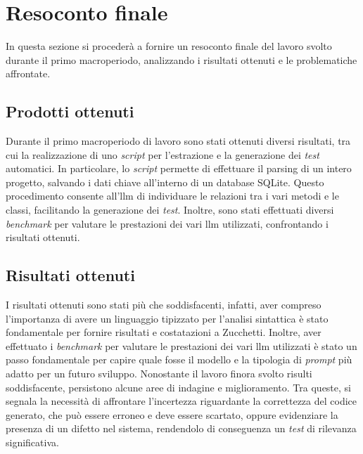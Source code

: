 \section{Resoconto finale}
    In questa sezione si procederà a fornire un resoconto finale del lavoro svolto durante il primo macroperiodo, analizzando i risultati ottenuti e le problematiche affrontate.
    \subsection{Prodotti ottenuti}
    Durante il primo macroperiodo di lavoro sono stati ottenuti diversi risultati, tra cui la realizzazione di uno \textit{script} per l'estrazione e la generazione dei \textit{test} automatici.
    In particolare, lo \textit{script} permette di effettuare il parsing di un intero progetto, salvando i dati chiave all'interno di un database SQLite.
    Questo procedimento consente all'\gls{llm} di individuare le relazioni tra i vari metodi e le classi, facilitando la generazione dei \textit{test}.
    Inoltre, sono stati effettuati diversi \textit{benchmark} per valutare le prestazioni dei vari \gls{llm} utilizzati, confrontando i risultati ottenuti.

    \subsection{Risultati ottenuti}
        I risultati ottenuti sono stati più che soddisfacenti, infatti, aver compreso l'importanza di avere un linguaggio tipizzato per l'analisi 
        sintattica è stato fondamentale per fornire risultati e costatazioni a Zucchetti.
        Inoltre, aver effettuato i \textit{benchmark} per valutare le prestazioni dei vari \gls{llm} utilizzati è stato un passo fondamentale 
        per capire quale fosse il modello e la tipologia di \textit{prompt} più adatto per un futuro sviluppo. 
        Nonostante il lavoro finora svolto risulti soddisfacente, persistono alcune aree di indagine e miglioramento. 
        Tra queste, si segnala la necessità di affrontare l'incertezza riguardante la correttezza del codice generato, 
        che può essere erroneo e deve essere scartato, oppure evidenziare la presenza di un difetto nel sistema, rendendolo di conseguenza un \textit{test} di rilevanza significativa.
